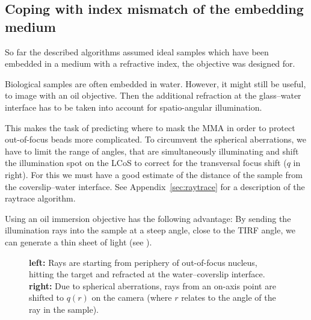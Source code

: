 






\subsection{Coping with index mismatch of the embedding medium}
So far the described algorithms assumed ideal samples which have been
embedded in a medium with a refractive index, the objective was
designed for.

Biological samples are often embedded in water. However, it might
still be useful, to image with an oil objective. Then the additional
refraction at the glass--water interface has to be taken into account
for spatio-angular illumination.

This makes the task of predicting where to mask the MMA in order to
protect out-of-focus beads more complicated. To circumvent the
spherical aberrations, we have to limit the range of angles, that are
simultaneously illuminating and shift the illumination spot on the
LCoS to correct for the transversal focus shift ($q$ in
 right). For this we must have a good
estimate of the distance of the sample from the coverslip--water
interface. See Appendix~\ref{sec:raytrace} for a description of the
raytrace algorithm.

Using an oil immersion objective has the following advantage: By
sending the illumination rays into the sample at a steep angle, close
to the TIRF angle, we can generate a thin sheet of light (see
).


\begin{figure}[!hbt]
  \centering
  \def\svgscale{.3}
  \qquad
  
  \caption{{\bf left:} Rays are starting from periphery of
    out-of-focus nucleus, hitting the target and refracted at the
    water--coverslip interface. {\bf right:} Due to spherical
    aberrations, rays from an on-axis point are shifted to $q(r)$ on
    the camera (where $r$ relates to the angle of the ray in the
    sample). }
  \label{fig:aberration-sketch}
\end{figure}

